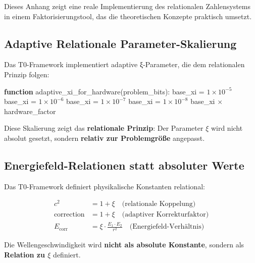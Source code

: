 	Dieses Anhang zeigt eine reale Implementierung des relationalen Zahlensystems in einem Faktorisierungstool, das die theoretischen Konzepte praktisch umsetzt.
	
	\subsection{Adaptive Relationale Parameter-Skalierung}
	
	Das T0-Framework implementiert adaptive ξ-Parameter, die dem relationalen Prinzip folgen:
	
	\begin{algorithm}[htbp]
		\caption{Adaptive $\xi$-Parameter im relationalen System}
		\label{alg:adaptive_xi}
		\begin{algorithmic}[1]
			\STATE \textbf{function} adaptive\_xi\_for\_hardware(problem\_bits):
			\STATE base\_xi = $1 \times 10^{-5}$ 
			\STATE base\_xi = $1 \times 10^{-6}$ 
			\STATE base\_xi = $1 \times 10^{-7}$ 
			\ELSE
			\STATE base\_xi = $1 \times 10^{-8}$ 
			\ENDIF
			\RETURN base\_xi $\times$ hardware\_factor
		\end{algorithmic}
	\end{algorithm}
	
	Diese Skalierung zeigt das \textbf{relationale Prinzip}: Der Parameter $\xi$ wird nicht absolut gesetzt, sondern \textbf{relativ zur Problemgröße} angepasst.
	
	\subsection{Energiefeld-Relationen statt absoluter Werte}
	
	Das T0-Framework definiert physikalische Konstanten relational:
	
	\begin{align}
		c^2 &= 1 + \xi \quad \text{(relationale Koppelung)} \\
		\text{correction} &= 1 + \xi \quad \text{(adaptiver Korrekturfaktor)} \\
		E_{\text{corr}} &= \xi \cdot \frac{E_1 \cdot E_2}{r^2} \quad \text{(Energiefeld-Verhältnis)}
	\end{align}
	
	Die Wellengeschwindigkeit wird \textbf{nicht als absolute Konstante}, sondern als \textbf{Relation zu $\xi$} definiert.
	
